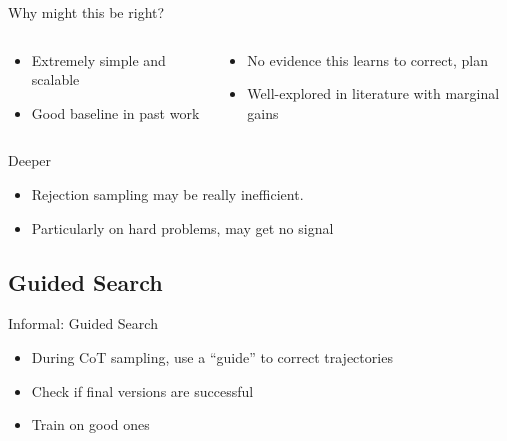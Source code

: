 \documentclass[14pt,aspectratio=169]{beamer}
\begin{document}
\begin{frame}{Why might this be right?}
	\begin{columns}
		\begin{column}{0.5\linewidth}
			\begin{itemize}
				\item Extremely simple and scalable
				\item Good baseline in past work
			\end{itemize}
		\end{column}
		\begin{column}{0.5\linewidth}
			\begin{itemize}
				\item No evidence this learns to correct, plan
				\item Well-explored in literature with marginal gains
			\end{itemize}
		\end{column}
	\end{columns}
\end{frame}

\begin{frame}{Deeper}
	\begin{itemize}
		\item Rejection sampling may be really inefficient.
		\item Particularly on hard problems, may get no signal
	\end{itemize}
\end{frame}

\subsection{Guided Search}

\begin{frame}{Informal: Guided Search}
	\begin{itemize}
		\item During CoT sampling, use a ``guide'' to
		      correct trajectories
		\item Check if final versions are successful
		\item Train on good ones
	\end{itemize}
\end{frame}
\end{document}
